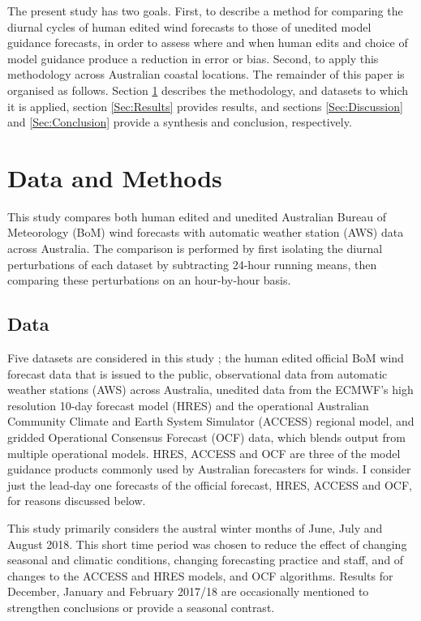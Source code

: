 \documentclass[twocol]{ametsoc}
\begin{document}
The present study has two goals. First, to describe a method for comparing the diurnal cycles of human edited wind forecasts to those of unedited model guidance forecasts, in order to assess where and when human edits and choice of model guidance produce a reduction in error or bias. Second, to apply this methodology across Australian coastal locations. The remainder of this paper is organised as follows. Section \ref{Sec:Methods} describes the methodology, and datasets to which it is applied, section \ref{Sec:Results} provides results, and sections \ref{Sec:Discussion} and \ref{Sec:Conclusion} provide a synthesis and conclusion, respectively.

\section{Data and Methods} \label{Sec:Methods}
This study compares both human edited and unedited Australian Bureau of Meteorology (BoM) wind forecasts with automatic weather station (AWS) data across Australia. The comparison is performed by first isolating the diurnal perturbations of each dataset by subtracting 24-hour running means, then comparing these perturbations on an hour-by-hour basis.

\subsection{Data}
Five datasets are considered in this study \citep{shortData19}; the human edited official BoM wind forecast data that is issued to the public, observational data from automatic weather stations (AWS) across Australia, unedited data from the ECMWF's high resolution 10-day forecast model (HRES) and the operational Australian Community Climate and Earth System Simulator (ACCESS) regional model, and gridded Operational Consensus Forecast (OCF) data, which blends output from multiple operational models. HRES, ACCESS and OCF are three of the model guidance products commonly used by Australian forecasters for winds. I consider just the lead-day one forecasts of the official forecast, HRES, ACCESS and OCF, for reasons discussed below. 

This study primarily considers the austral winter months of June, July and August 2018. This short time period was chosen to reduce the effect of changing seasonal and climatic conditions, changing forecasting practice and staff, and of changes to the ACCESS and HRES models, and OCF algorithms. Results for December, January and February 2017/18 are occasionally mentioned to strengthen conclusions or provide a seasonal contrast. 
\end{document}
